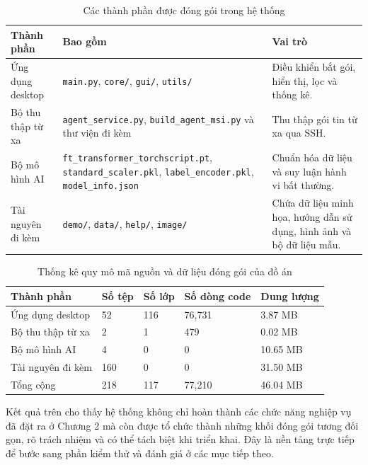 \documentclass[../DoAn.tex]{subfiles}
\begin{document}
\begin{table}[H]
\centering
\begin{tabular}{p{3.1cm}p{6.8cm}p{4.0cm}}
\hline
\textbf{Thành phần} & \textbf{Bao gồm} & \textbf{Vai trò} \\ \hline
Ứng dụng desktop & \texttt{main.py}, \texttt{core/}, \texttt{gui/}, \texttt{utils/} & Điều khiển bắt gói, hiển thị, lọc và thống kê. \\ \hline
Bộ thu thập từ xa & \texttt{agent\_service.py}, \texttt{build\_agent\_msi.py} và thư viện đi kèm & Thu thập gói tin từ xa qua SSH. \\ \hline
Bộ mô hình AI & \texttt{ft\_transformer\_torchscript.pt}, \texttt{standard\_scaler.pkl}, \texttt{label\_encoder.pkl}, \texttt{model\_info.json} & Chuẩn hóa dữ liệu và suy luận hành vi bất thường. \\ \hline
Tài nguyên đi kèm & \texttt{demo/}, \texttt{data/}, \texttt{help/}, \texttt{image/} & Chứa dữ liệu minh họa, hướng dẫn sử dụng, hình ảnh và bộ dữ liệu mẫu. \\ \hline
\end{tabular}
\caption{Các thành phần được đóng gói trong hệ thống}
\label{tab:packaged_components}
\end{table}

\begin{table}[H]
\centering
\begin{tabular}{p{3.6cm}p{1.8cm}p{1.8cm}p{2.4cm}p{2.4cm}}
\hline
\textbf{Thành phần} & \textbf{Số tệp} & \textbf{Số lớp} & \textbf{Số dòng code} & \textbf{Dung lượng} \\ \hline
Ứng dụng desktop & 52 & 116 & 76,731 & 3.87 MB \\ \hline
Bộ thu thập từ xa & 2 & 1 & 479 & 0.02 MB \\ \hline
Bộ mô hình AI & 4 & 0 & 0 & 10.65 MB \\ \hline
Tài nguyên đi kèm & 160 & 0 & 0 & 31.50 MB \\ \hline
Tổng cộng & 218 & 117 & 77,210 & 46.04 MB \\ \hline
\end{tabular}
\caption{Thống kê quy mô mã nguồn và dữ liệu đóng gói của đồ án}
\label{tab:code_statistics}
\end{table}

Kết quả trên cho thấy hệ thống không chỉ hoàn thành các chức năng nghiệp vụ đã đặt ra ở Chương 2 mà còn được tổ chức thành những khối đóng gói tương đối gọn, rõ trách nhiệm và có thể tách biệt khi triển khai. Đây là nền tảng trực tiếp để bước sang phần kiểm thử và đánh giá ở các mục tiếp theo.
\end{document}
